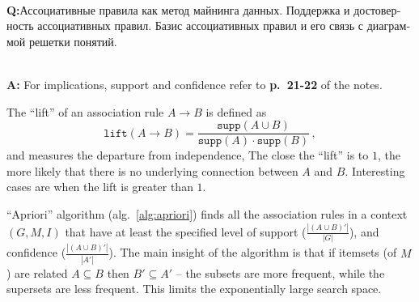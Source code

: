 \documentclass[a4paper]{article}
\newcommand{\rus}[1]{\foreignlanguage{russian}{#1}}
\begin{document}
\hfill\\\textbf{Q:}\rus{Ассоциативные правила как метод майнинга данных. Поддержка
и достоверность ассоциативных правил. Базис ассоциативных правил и его связь с диаграммой
решетки понятий.}

\hfill\\\textbf{A:}
For implications, support and confidence refer to \textbf{p.~21-22} of the notes.

The ``lift'' of an association rule $A\to B$ is defined as 
$$ \mathtt{lift}(A\to B)
    = \frac{\mathtt{supp}(A\cup B)}{\mathtt{supp}(A)\cdot \mathtt{supp}(B)}
    \,, $$
and measures the departure from independence, The close the ``lift'' is to $1$,
the more likely that there is no underlying connection between $A$ and $B$. Interesting
cases are when the lift is greater than $1$. 

``Apriori'' algorithm (alg.~\ref{alg:apriori}) finds all the association rules in a
context $(G, M, I)$ that have at least the specified level of support ($\frac{|(A\cup B)'|}{|G|}$),
and confidence ($\frac{|(A\cup B)'|}{|A'|}$). The main insight of the algorithm
is that if itemsets (of $M$) are related $A\subseteq B$ then $B'\subseteq A'$ --
the subsets are more frequent, while the supersets are less frequent. This limits
the exponentially large search space.

\end{document}
